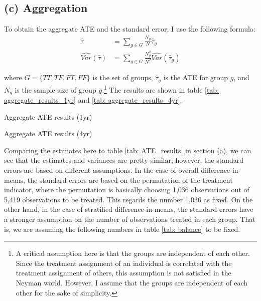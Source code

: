 \documentclass[11pt]{article}
\numberwithin{equation}{section}
\begin{document}
\subsection*{(c) Aggregation}

To obtain the aggregate ATE and the standard error, I use the following formula:
\begin{align}
    \hat{\tau} &= \sum_{g \in G} \frac{N_g}{N}\hat{\tau}_g \label{eq:aggregate_ATE}\\
    \hat{Var}(\hat{\tau}) &= \sum_{g \in G} \frac{N_g^2}{N^2}\hat{Var}(\hat{\tau}_g) \label{eq:aggregate_var}
\end{align}

where $G = \{TT, TF, FT, FF\}$ is the set of groups, $\hat{\tau}_g$ is the ATE for group $g$, and $N_g$ is the sample size of group $g$.\footnote{A critical assumption here is that the groups are independent of each other. Since the treatment assignment of an individual is correlated with the treatment assignment of others, this assumption is not satisfied in the Neyman world. However, I assume that the groups are independent of each other for the sake of simplicity.}
The results are shown in table \ref{tab: aggregate_results_1yr} and \ref{tab: aggregate_results_4yr}.

\begin{table}[h]
    \centering
    \small
    
    \caption{\label{tab: aggregate_results_1yr}Aggregate ATE results (1yr)}
\end{table}

\begin{table}[h]
    \centering
    \small
    
    \caption{\label{tab: aggregate_results_4yr}Aggregate ATE results (4yr)}
\end{table}


Comparing the estimates here to table \ref{tab: ATE_results} in section (a), we can see that the estimates and variances are pretty similar; however, the standard errors are based on different assumptions.
In the case of overall difference-in-means, the standard errors are based on the permutation of the treatment indicator, where the permutation is basically choosing 1,036 observations out of 5,419 observations to be treated.
This regards the number 1,036 as fixed.
On the other hand, in the case of stratified difference-in-means, the standard errors have a stronger assumption on the number of observations treated in each group.
That is, we are assuming the following numbers in table \ref{tab: balance} to be fixed.
\end{document}
